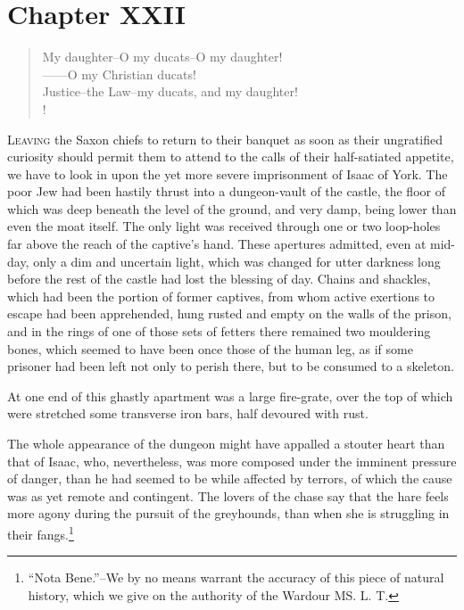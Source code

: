 \chapter{Chapter XXII}

\begin{verse}
My daughter--O my ducats--O my daughter!\\
------O my Christian ducats!\\
Justice--the Law--my ducats, and my daughter!\\!
\end{verse}

\lettrine{L}{eaving} the Saxon chiefs to return to their banquet as
soon as their
ungratified curiosity should permit them to attend to the calls of their
half-satiated appetite, we have to look in upon the yet more severe
imprisonment of Isaac of York. The poor Jew had been hastily thrust into
a dungeon-vault of the castle, the floor of which was deep beneath the
level of the ground, and very damp, being lower than even the moat
itself. The only light was received through one or two loop-holes far
above the reach of the captive's hand. These apertures admitted, even at
mid-day, only a dim and uncertain light, which was changed for utter
darkness long before the rest of the castle had lost the blessing of
day. Chains and shackles, which had been the portion of former captives,
from whom active exertions to escape had been apprehended, hung rusted
and empty on the walls of the prison, and in the rings of one of those
sets of fetters there remained two mouldering bones, which seemed to
have been once those of the human leg, as if some prisoner had been left
not only to perish there, but to be consumed to a skeleton.

At one end of this ghastly apartment was a large fire-grate, over the
top of which were stretched some transverse iron bars, half devoured
with rust.

The whole appearance of the dungeon might have appalled a stouter heart
than that of Isaac, who, nevertheless, was more composed under the
imminent pressure of danger, than he had seemed to be while affected by
terrors, of which the cause was as yet remote and contingent. The lovers
of the chase say that the hare feels more agony during the pursuit of
the greyhounds, than when she is struggling in their fangs.\footnote{``Nota
Bene.''--We by no means warrant the accuracy of
this piece of natural history, which we give on the authority of the
Wardour MS. L. T.}

